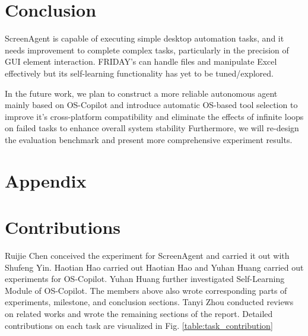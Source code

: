 \documentclass[11pt,letterpaper]{article}
\begin{document}
\section{Conclusion}
ScreenAgent is capable of executing simple desktop automation tasks, and it needs improvement to complete complex tasks, particularly in the precision of GUI element interaction.
%
FRIDAY's can handle files and manipulate Excel effectively but its self-learning functionality has yet to be tuned/explored.

\vspace{10pt}

\noindent In the future work, we plan to construct a more reliable autonomous agent mainly based on OS-Copilot and introduce automatic OS-based tool selection to improve it's cross-platform compatibility and eliminate the effects of infinite loops on failed tasks to enhance overall system stability
%
Furthermore, we will re-design the evaluation benchmark and present more comprehensive experiment results.
%
%




\section*{\LARGE Appendix}
\section*{Contributions}

Ruijie Chen conceived the experiment for ScreenAgent and carried it out with Shufeng Yin. Haotian Hao carried out Haotian Hao and Yuhan Huang carried out experiments for OS-Copilot. Yuhan Huang further investigated Self-Learning Module of OS-Copilot. The members above also wrote corresponding parts of experiments, milestone, and conclusion sections. Tanyi Zhou conducted reviews on related works and wrote the remaining sections of the report. Detailed contributions on each task are visualized in Fig. \ref{table:task_contribution}
\end{document}
